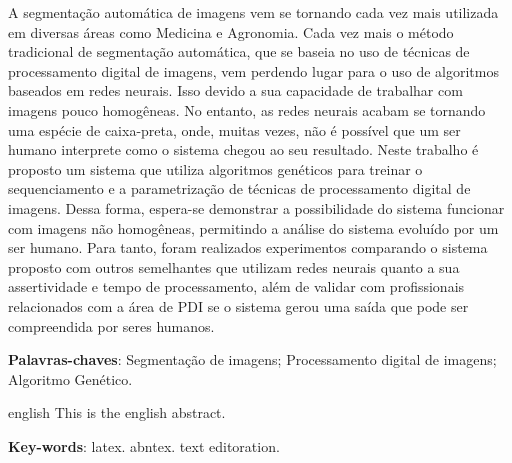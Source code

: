 \documentclass[12pt,oneside,a4paper,english,french,spanish,brazil,]{abntex2}
\begin{document}

\frenchspacing 

\imprimircapa
\imprimirfolhaderosto


\begin{resumo}
A segmentação automática de imagens vem se tornando cada vez mais utilizada em diversas áreas como Medicina e Agronomia. Cada vez mais o método tradicional de segmentação automática, que se baseia no uso de técnicas de processamento digital de imagens, vem perdendo lugar para o uso de algoritmos baseados em redes neurais. Isso devido a sua capacidade de trabalhar com imagens pouco homogêneas. No entanto, as redes neurais acabam se tornando uma espécie de caixa-preta, onde, muitas vezes, não é possível que um ser humano interprete como o sistema chegou ao seu resultado. Neste trabalho é proposto um sistema que utiliza algoritmos genéticos para treinar o sequenciamento e a parametrização de técnicas de processamento digital de imagens. Dessa forma, espera-se demonstrar a possibilidade do sistema funcionar com imagens não homogêneas, permitindo a análise do sistema evoluído por um ser humano. Para tanto, foram realizados experimentos comparando o sistema proposto com outros semelhantes que utilizam redes neurais quanto a sua assertividade e tempo de processamento, além de validar com profissionais relacionados com a área de PDI se o sistema gerou uma saída que pode ser compreendida por seres humanos.

 \vspace{\onelineskip}
    
 \noindent
 \textbf{Palavras-chaves}: Segmentação de imagens; Processamento digital de imagens; Algoritmo Genético.
\end{resumo}

\begin{resumo}[Abstract]
 \begin{otherlanguage*}{english}
   This is the english abstract.

   \vspace{\onelineskip}
 
   \noindent 
   \textbf{Key-words}: latex. abntex. text editoration.
 \end{otherlanguage*}
\end{resumo}
\end{document}
